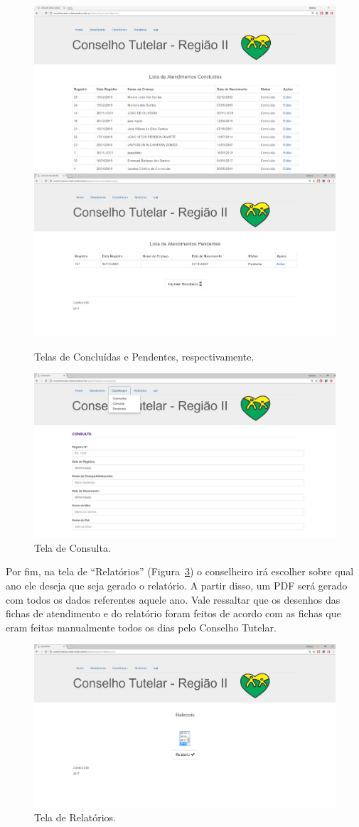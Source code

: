 \documentclass[12pt]{article}
\begin{document}
\begin{figure}[tb]
\begin{center}
	\includegraphics[height=3.5 cm]{fig/6.png} \quad
	\includegraphics[height=3.5 cm]{fig/7.png}
\caption{Telas de Concluídas e Pendentes, respectivamente. } \label{fig:pendente}
\end{center}
\end{figure}

\begin{figure}[ht]
\centering
\includegraphics[width=.55\textwidth]{fig/5.png}
\caption{Tela de Consulta.}
\label{fig:consulta}
\end{figure}

Por fim, na tela de ``Relatórios'' (Figura~\ref{fig:relatorio}) o conselheiro irá escolher sobre qual ano ele deseja que seja gerado o relatório. A partir disso, um PDF será gerado com todos os dados referentes aquele ano. Vale ressaltar que os desenhos das fichas de atendimento e do relatório foram feitos de acordo com as fichas que eram feitas manualmente todos os dias pelo Conselho Tutelar.

\begin{figure}[ht]
\centering
\includegraphics[width=.55\textwidth]{fig/8.png}
\caption{Tela de Relatórios.}
\label{fig:relatorio}
\end{figure}
\end{document}
